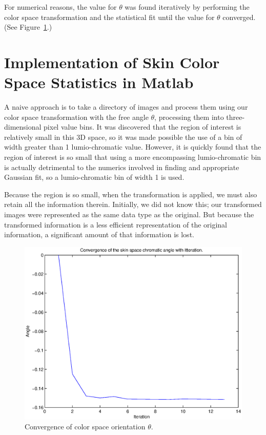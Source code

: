 For numerical reasons, the value for $\theta$ was found iteratively by performing the color space transformation and the statistical fit until the value for $\theta$ converged. (See Figure~\ref{fig:ConvergenceTheta}.)


\section{Implementation of Skin Color Space Statistics in Matlab}\label{sec:SkinColorSpaceStatsMatlab}

A naive approach is to take a directory of images and process them using our color space transformation with the free angle $\theta$, processing them into three-dimensional pixel value bins. It was discovered that the region of interest is relatively small in this 3D space, so it was made possible the use of a bin of width greater than 1 lumio-chromatic value. However, it is quickly found that the region of interest is so small that using a more encompassing lumio-chromatic bin is actually detrimental to the numerics involved in finding and appropriate Gaussian fit, so a lumio-chromatic bin of width 1 is used.

Because the region is so small, when the transformation is applied, we must also retain all the information therein. Initially, we did not know this; our transformed images were represented as the same data type as the original. But because the transformed information is a less efficient representation of the original information, a significant amount of that information is lost.

\begin{figure}[h!]
  \centering
    \includegraphics[width=\textwidth]{Chapter3/Figs/ConvergenceOfSkinSpaceFinal.eps}
    \caption{Convergence of color space orientation $\theta$.}  \label{fig:ConvergenceTheta}
\end{figure}

